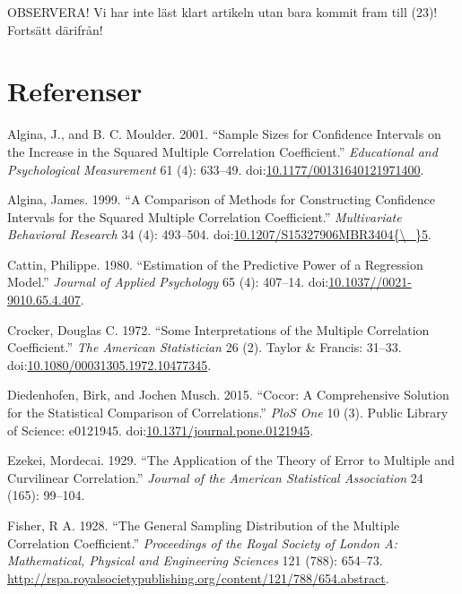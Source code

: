 \documentclass[]{article}
\begin{document}
OBSERVERA! Vi har inte läst klart artikeln utan bara kommit fram till
(23)! Fortsätt därifrån!

\section*{Referenser}\label{referenser}

\hypertarget{refs}{}
\hypertarget{ref-Algina2001}{}
Algina, J., and B. C. Moulder. 2001. ``Sample Sizes for Confidence
Intervals on the Increase in the Squared Multiple Correlation
Coefficient.'' \emph{Educational and Psychological Measurement} 61 (4):
633--49.
doi:\href{https://doi.org/10.1177/00131640121971400}{10.1177/00131640121971400}.

\hypertarget{ref-Algina1999}{}
Algina, James. 1999. ``A Comparison of Methods for Constructing
Confidence Intervals for the Squared Multiple Correlation Coefficient.''
\emph{Multivariate Behavioral Research} 34 (4): 493--504.
doi:\href{https://doi.org/10.1207/S15327906MBR3404\%7B/_\%7D5}{10.1207/S15327906MBR3404\{\textbackslash{}\_\}5}.

\hypertarget{ref-Cattin1980}{}
Cattin, Philippe. 1980. ``Estimation of the Predictive Power of a
Regression Model.'' \emph{Journal of Applied Psychology} 65 (4):
407--14.
doi:\href{https://doi.org/10.1037//0021-9010.65.4.407}{10.1037//0021-9010.65.4.407}.

\hypertarget{ref-Crocker1972}{}
Crocker, Douglas C. 1972. ``Some Interpretations of the Multiple
Correlation Coefficient.'' \emph{The American Statistician} 26 (2).
Taylor \& Francis: 31--33.
doi:\href{https://doi.org/10.1080/00031305.1972.10477345}{10.1080/00031305.1972.10477345}.

\hypertarget{ref-Diedenhofen2015}{}
Diedenhofen, Birk, and Jochen Musch. 2015. ``Cocor: A Comprehensive
Solution for the Statistical Comparison of Correlations.'' \emph{PloS
One} 10 (3). Public Library of Science: e0121945.
doi:\href{https://doi.org/10.1371/journal.pone.0121945}{10.1371/journal.pone.0121945}.

\hypertarget{ref-Ezekei1929}{}
Ezekei, Mordecai. 1929. ``The Application of the Theory of Error to
Multiple and Curvilinear Correlation.'' \emph{Journal of the American
Statistical Association} 24 (165): 99--104.

\hypertarget{ref-Fisher1928}{}
Fisher, R A. 1928. ``The General Sampling Distribution of the Multiple
Correlation Coefficient.'' \emph{Proceedings of the Royal Society of
London A: Mathematical, Physical and Engineering Sciences} 121 (788):
654--73.
\url{http://rspa.royalsocietypublishing.org/content/121/788/654.abstract}.
\end{document}
